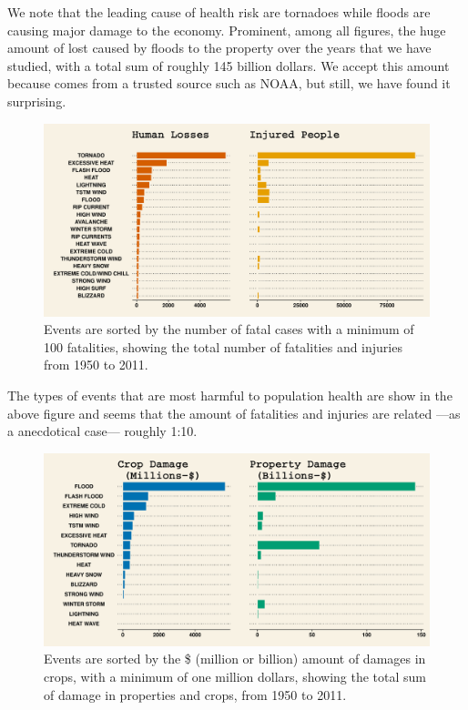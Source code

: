 \documentclass[12pt,spanish, american,b4paper, onecolumn, lmargin=1cm, rmargin=1cm, tmargin=1cm, bmargin=2cm,]{article}
\begin{document}
We note that the leading cause of health risk are tornadoes while floods
are causing major damage to the economy. Prominent, among all figures,
the huge amount of lost caused by floods to the property over the years
that we have studied, with a total sum of roughly 145 billion dollars.
We accept this amount because comes from a trusted source such as NOAA,
but still, we have found it surprising.

\begin{figure}[htbp]
\centering
\includegraphics{./proj2_files/figure-latex/ThePlotOne.pdf}
\caption{Events are sorted by the number of fatal cases with a minimum
of 100 fatalities, showing the total number of fatalities and injuries
from 1950 to 2011.}
\end{figure}

The types of events that are most harmful to population health are show
in the above figure and seems that the amount of fatalities and injuries
are related ---as a anecdotical case--- roughly 1:10.

\begin{figure}[htbp]
\centering
\includegraphics{./proj2_files/figure-latex/ThePlotTwo.pdf}
\caption{Events are sorted by the \$ (million or billion) amount of
damages in crops, with a minimum of one million dollars, showing the
total sum of damage in properties and crops, from 1950 to 2011.}
\end{figure}
\end{document}

